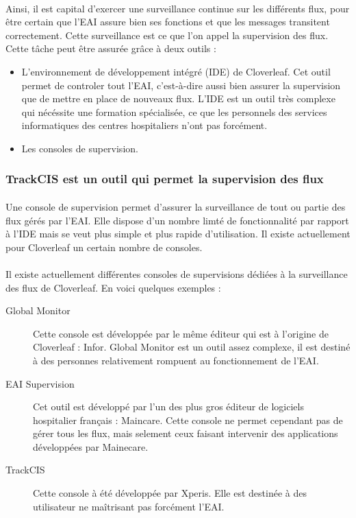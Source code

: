 			\paragraph{}%
			Ainsi, il est capital d'exercer une surveillance continue sur les différents
			flux, pour être certain que l'EAI assure bien ses fonctions et que les
			messages transitent correctement. Cette surveillance est ce que l'on appel la
			supervision des flux. Cette tâche peut être assurée grâce à deux outils :
			\begin{itemize}
			  \item L'environnement de développement intégré (IDE) de Cloverleaf. Cet
			  outil permet de controler tout l'EAI, c'est-à-dire aussi bien assurer la
			  supervision que de mettre en place de nouveaux flux. L'IDE est un outil
			  très complexe qui nécéssite une formation spécialisée, ce que les
			  personnels des services informatiques des centres hospitaliers n'ont pas
			  forcément.
			  \item Les consoles de supervision.
			\end{itemize}
			
		\subsubsection{TrackCIS est un outil qui permet la supervision des flux}
			\paragraph{}%
			Une console de supervision permet d'assurer la surveillance
			de tout ou partie des flux gérés par l'EAI. Elle dispose d'un
			nombre limté de fonctionnalité par rapport à l'IDE mais se veut plus simple
			et plus rapide d'utilisation. Il existe actuellement pour Cloverleaf un
			certain nombre de consoles.
			
			\paragraph{}%
			Il existe actuellement différentes consoles de supervisions dédiées à la
			surveillance des flux de Cloverleaf. En voici quelques exemples :
			\begin{description}
				\item[Global Monitor] Cette console est développée par le même éditeur qui
				est à l'origine de Cloverleaf : Infor. Global Monitor est un outil assez
				complexe, il est destiné à des personnes relativement rompuent au
				fonctionnement de l'EAI.
				\item[EAI Supervision] Cet outil est développé par l'un des plus gros
				éditeur de logiciels hospitalier français : Maincare. Cette console ne
				permet cependant pas de gérer tous les flux, mais selement ceux faisant
				intervenir des applications développées par Mainecare.
				\item[TrackCIS] Cette console à été développée par Xperis. Elle est destinée
				à des utilisateur ne maîtrisant pas forcément l'EAI.
			\end{description}
			
